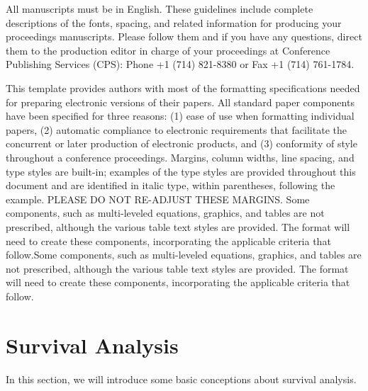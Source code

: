 \documentclass[conference]{IEEEconf}
\begin{document}
All manuscripts must be in English. These guidelines include complete descriptions of the fonts, spacing, and related information for producing your proceedings manuscripts. Please follow them and if you have any questions, direct them to the production editor in charge of your proceedings at Conference Publishing Services (CPS): Phone +1 (714) 821-8380 or Fax +1 (714) 761-1784.

This template provides authors with most of the formatting specifications needed for preparing electronic versions of their papers. All standard paper components have been specified for three reasons: (1) ease of use when formatting individual papers, (2) automatic compliance to electronic requirements that facilitate the concurrent or later production of electronic products, and (3) conformity of style throughout a conference proceedings. Margins, column widths, line spacing, and type styles are built-in; examples of the type styles are provided throughout this document and are identified in italic type, within parentheses, following the example. PLEASE DO NOT RE-ADJUST THESE MARGINS. Some components, such as multi-leveled equations, graphics, and tables are not prescribed, although the various table text styles are provided. The format will need to create these components, incorporating the applicable criteria that follow.Some components, such as multi-leveled equations, graphics, and tables are not prescribed, although the various table text styles are provided. The format will need to create these components, incorporating the applicable criteria that follow.

\section{Survival Analysis}
In this section, we will introduce some basic conceptions about survival analysis.
\end{document}
